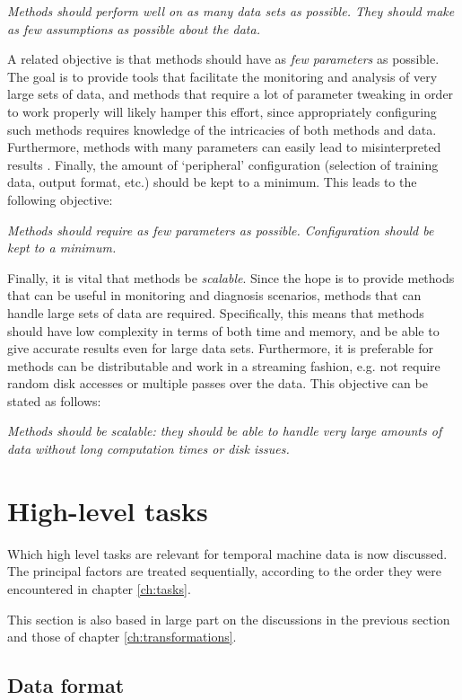   \emph{Methods should perform well on as many data sets as possible. They should make as few assumptions as possible about the data.}

A related objective is that methods should have as \emph{few parameters} as possible. The goal is to provide tools that facilitate the monitoring and analysis of very large sets of data, and methods that require a lot of parameter tweaking in order to work properly will likely hamper this effort, since appropriately configuring such methods requires knowledge of the intricacies of both methods and data. Furthermore, methods with many parameters can easily lead to misinterpreted results \cite{keogh2}. Finally, the amount of `peripheral' configuration (selection of training data, output format, etc.) should be kept to a minimum. This leads to the following objective:

  \emph{Methods should require as few parameters as possible. Configuration should be kept to a minimum.}

Finally, it is vital that methods be \emph{scalable}. Since the hope is to provide methods that can be useful in monitoring and diagnosis scenarios, methods that can handle large sets of data are required. Specifically, this means that methods should have low complexity in terms of both time and memory, and be able to give accurate results even for large data sets. Furthermore, it is preferable for methods can be distributable and work in a streaming fashion, e.g. not require random disk accesses or multiple passes over the data. This objective can be stated as follows:

  \emph{Methods should be scalable: they should be able to handle very large amounts of data without long computation times or disk issues.}

\section{High-level tasks}
\label{sect:relevant_tasks}

Which high level tasks are relevant for temporal machine data is now discussed. The principal factors are treated sequentially, according to the order they were encountered in chapter \ref{ch:tasks}.

This section is also based in large part on the discussions in the previous section and those of chapter \ref{ch:transformations}. 

\subsection{Data format}
\label{sect:relevant_data_format}

